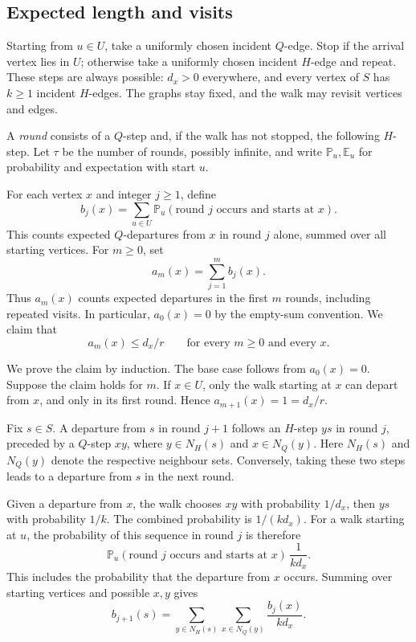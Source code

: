 \documentclass[11pt]{amsart}
\theoremstyle{remark}
\newcommand{\E}{\mathbb E}
\newcommand{\Prob}{\mathbb P}
\begin{document}
\subsection{Expected length and visits}\label{subsec:walk-estimates}

Starting from $u\in U$, take a uniformly chosen incident $Q$-edge. Stop if the arrival vertex lies in $U$; otherwise take a uniformly chosen incident $H$-edge and repeat. These steps are always possible: $d_x>0$ everywhere, and every vertex of $S$ has $k\ge1$ incident $H$-edges. The graphs stay fixed, and the walk may revisit vertices and edges.

A \emph{round} consists of a $Q$-step and, if the walk has not stopped, the following $H$-step. Let $\tau$ be the number of rounds, possibly infinite, and write $\Prob_u,\E_u$ for probability and expectation with start $u$.

For each vertex $x$ and integer $j\ge1$, define
\[
b_j(x)=\sum_{u\in U}
\Prob_u(\text{round $j$ occurs and starts at $x$}).
\]
This counts expected $Q$-departures from $x$ in round $j$ alone, summed over all starting vertices. For $m\ge0$, set
\[
a_m(x)=\sum_{j=1}^{m}b_j(x).
\]
Thus $a_m(x)$ counts expected departures in the first $m$ rounds, including repeated visits. In particular, $a_0(x)=0$ by the empty-sum convention. We claim that
\begin{equation}\label{eq:visits}
a_m(x)\le d_x/r\qquad\text{for every $m\ge0$ and every $x$.}
\end{equation}

We prove the claim by induction. The base case follows from $a_0(x)=0$. Suppose the claim holds for $m$. If $x\in U$, only the walk starting at $x$ can depart from $x$, and only in its first round. Hence $a_{m+1}(x)=1=d_x/r$.

Fix $s\in S$. A departure from $s$ in round $j+1$ follows an $H$-step $ys$ in round $j$, preceded by a $Q$-step $xy$, where $y\in N_H(s)$ and $x\in N_Q(y)$. Here $N_H(s)$ and $N_Q(y)$ denote the respective neighbour sets. Conversely, taking these two steps leads to a departure from $s$ in the next round.

Given a departure from $x$, the walk chooses $xy$ with probability $1/d_x$, then $ys$ with probability $1/k$. The combined probability is $1/(k d_x)$. For a walk starting at $u$, the probability of this sequence in round $j$ is therefore
\[
\Prob_u(\text{round $j$ occurs and starts at $x$})\,\frac1{k d_x}.
\]
This includes the probability that the departure from $x$ occurs. Summing over starting vertices and possible $x,y$ gives
\[
b_{j+1}(s)=\sum_{y\in N_H(s)}\sum_{x\in N_Q(y)}\frac{b_j(x)}{k d_x}.
\]
\end{document}
